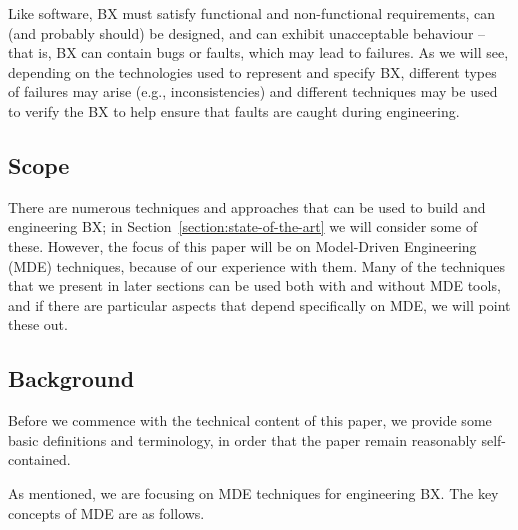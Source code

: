 Like software, BX must satisfy functional and non-functional requirements, can (and probably should) be designed, and can exhibit unacceptable behaviour -- that is, BX can contain bugs or faults, which may lead to failures. As we will see, depending on the technologies used to represent and specify BX, different types of failures may arise (e.g., inconsistencies) and different techniques may be used to verify the BX to help ensure that faults are caught during engineering.

\subsection{Scope}
There are numerous techniques and approaches that can be used to build and engineering BX; in Section~\ref{section:state-of-the-art} we will consider some of these. However, the focus of this paper will be on Model-Driven Engineering (MDE) techniques, because of our experience with them. Many of the techniques that we present in later sections can be used both with and without MDE tools, and if there are particular aspects that depend specifically on MDE, we will point these out.

\subsection{Background}
Before we commence with the technical content of this paper, we provide some basic definitions and terminology, in order that the paper remain reasonably self-contained.

As mentioned, we are focusing on MDE techniques for engineering BX. The key concepts of MDE are as follows.

